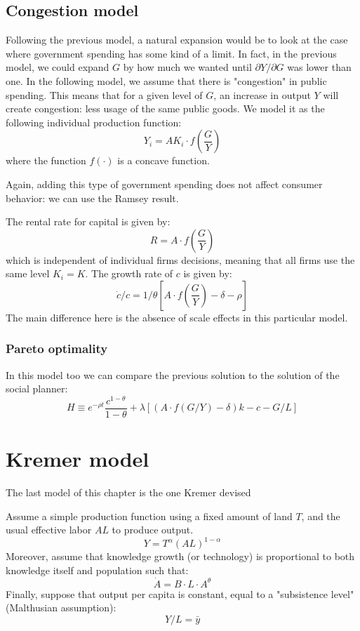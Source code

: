 \documentclass[12pt]{report}
\begin{document}
\subsection{Congestion model}

Following the previous model, a natural expansion would be to look at the case where government spending has some kind of a limit. In fact, in the previous model, we could expand $G$ by how much we wanted until $\partial Y/\partial G$ was lower than one. In the following model, we assume that there is "congestion" in public spending. This means that for a given level of $G$, an increase in output $Y$ will create congestion: less usage of the same public goods. We model it as the following individual production function: $$ Y_i = A K_i\cdot f\left(\frac{G}{Y}\right) $$ where the function $f(\cdot)$ is a concave function.

Again, adding this type of government spending does not affect consumer behavior: we can use the Ramsey result.

The rental rate for capital is given by: $$ R = A \cdot f\left(\frac{G}{Y}\right) $$ which is independent of individual firms decisions, meaning that all firms use the same level $K_i = K$. The growth rate of $c$ is given by: $$\dot c/c = 1/\theta \left[ A \cdot f\left(\frac{G}{Y}\right) - \delta - \rho \right] $$ The main difference here is the absence of scale effects in this particular model.

\subsubsection{Pareto optimality}

In this model too we can compare the previous solution to the solution of the social planner: $$H \equiv e^{-\rho t} \frac{c^{1-\theta}}{1-\theta} + \lambda\left[\left(A \cdot f\left(G/Y\right) - \delta\right)k - c - G/L\right] $$

\section{Kremer model}

The last model of this chapter is the one Kremer devised 

Assume a simple production function using a fixed amount of land $T$, and the usual effective labor $AL$ to produce output. $$ Y = T^\alpha (AL)^{1-\alpha} $$ Moreover, assume that knowledge growth (or technology) is proportional to both knowledge itself and population such that: $$ \dot A = B\cdot L \cdot A^{\theta} $$ Finally, suppose that output per capita is constant, equal to a "subsistence level" (Malthusian assumption): $$ Y/L = \bar y $$
\end{document}
